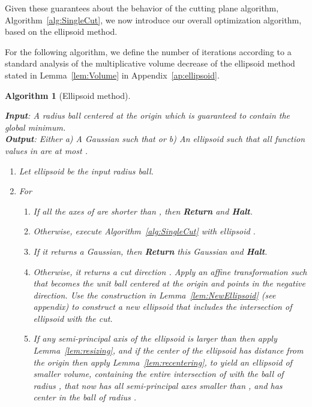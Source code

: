 \documentclass[11pt,letter]{article}
\numberwithin{nTheorems}{section}
\newtheorem{myalgorithm}{Algorithm}
\begin{document}
Given these guarantees about the behavior of the cutting plane algorithm, Algorithm~\ref{alg:SingleCut}, we now introduce our overall optimization algorithm, based on the ellipsoid method.

For the following algorithm, we define the number of iterations  according to a standard analysis of the multiplicative volume decrease of the ellipsoid method stated in Lemma~\ref{lem:Volume} in Appendix~\ref{ap:ellipsoid}.

\vspace{3mm}
\hspace*{-\parindent}\begin{minipage}{\linewidth}
\begin{framed}
\begin{myalgorithm}[Ellipsoid method]
\label{alg:Ellipsoid}

\noindent\textbf{Input}: A radius  ball centered at the origin which is guaranteed to contain the global minimum.\\
\textbf{Output}: \emph{Either} a) A Gaussian  such that  \emph{or} b) An ellipsoid  such that all function values in  are at most .
\begin{enumerate}
   \item Let ellipsoid  be the input radius  ball.
   \item For 
         \begin{enumerate}
            \renewcommand{\labelenumii}{\arabic{enumi}\alph{enumii}.}
            \item If all the axes of  are shorter than , then \textbf{Return}  and \textbf{Halt}.
            \item Otherwise, execute Algorithm~\ref{alg:SingleCut} with ellipsoid .
            \item If it returns a Gaussian, then \textbf{Return} this Gaussian and \textbf{Halt}.
            \item Otherwise, it returns a cut direction .
            Apply an affine transformation such that  becomes the unit ball centered at the origin and  points in the negative  direction.
            Use the construction in Lemma~\ref{lem:NewEllipsoid} (see appendix) to construct a new ellipsoid  that includes the intersection of ellipsoid  with the cut.
            \item If any semi-principal axis of the ellipsoid  is larger than  then apply Lemma~\ref{lem:resizing}, and if the center of the ellipsoid has distance  from the origin then apply Lemma~\ref{lem:recentering}, to yield an ellipsoid of smaller volume, containing the entire intersection of  with the ball of radius , that now has all semi-principal axes smaller than , and has center in the ball of radius .
          \end{enumerate}
\end{enumerate}
\end{myalgorithm}
\end{framed}
\end{minipage}
\vspace{3mm}
\end{document}
